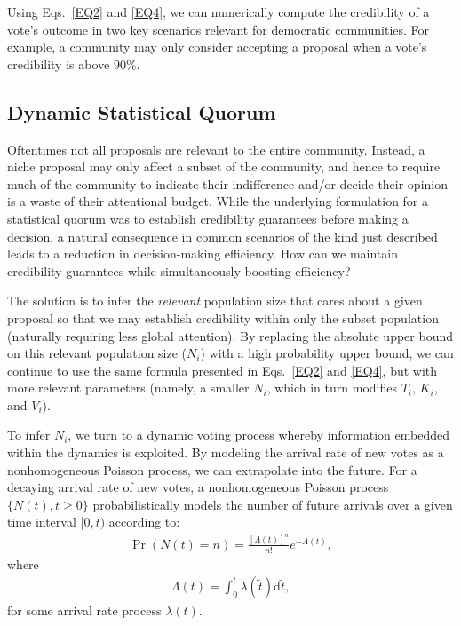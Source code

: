 \documentclass[format=acmsmall, review=true, screen=true, anonymous=true]{acmart}
\begin{document}
Using Eqs.~\eqref{EQ2} and \eqref{EQ4}, we can numerically compute the credibility of a
vote's outcome in two key scenarios relevant for democratic communities.
For example, a community may only consider accepting a proposal when a vote's credibility
is above $90\%$.

\subsection{Dynamic Statistical Quorum}
Oftentimes not all proposals are relevant to the entire community.
Instead, a niche proposal may only affect a subset of the community, and hence to require much
of the community to indicate their indifference and/or decide their opinion is a waste of their
attentional budget.
While the underlying formulation for a statistical quorum was to establish credibility guarantees
before making a decision, a natural consequence in common scenarios of the kind just described
leads to a reduction in decision-making efficiency.
How can we maintain credibility guarantees while simultaneously boosting efficiency?

The solution is to infer the \textit{relevant} population size that cares about a given proposal
so that we may establish credibility within only the subset population (naturally requiring less
global attention).
By replacing the absolute upper bound on this relevant population size ($N_i$) with a high
probability upper bound, we can continue to use the same formula presented in Eqs.~\eqref{EQ2}
and \eqref{EQ4}, but with more relevant parameters (namely, a smaller $N_i$, which in turn
modifies $T_i$, $K_i$, and $V_i$).

To infer $N_i$, we turn to a dynamic voting process whereby information embedded within the
dynamics is exploited.
By modeling the arrival rate of new votes as a nonhomogeneous Poisson process, we can extrapolate
into the future.
For a decaying arrival rate of new votes, a nonhomogeneous Poisson process
$\{N(t),t\geq 0\}$ probabilistically models the number of future arrivals over a given time
interval $[0,t)$ according to:
\begin{align*}
\Pr(N(t)=n)={\frac {[\Lambda (t)]^{n}}{n!}}e^{-\Lambda (t)},
\end{align*}
where
\begin{align*}
\Lambda (t)=\int _{0}^{t}\lambda (\tilde{t})\mathrm{d}\tilde{t},
\end{align*}
for some arrival rate process $\lambda (t)$.
\end{document}
